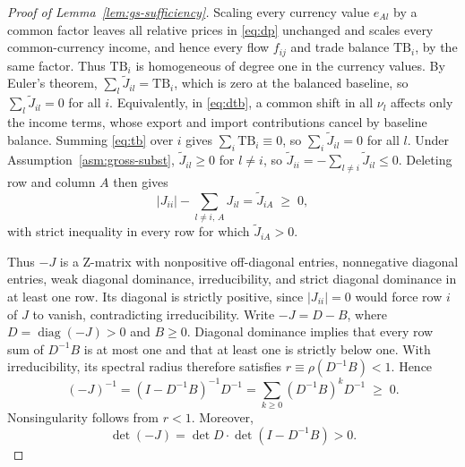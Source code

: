 \documentclass[11pt]{article}
\begin{document}
\begin{proof}[Proof of Lemma~\ref{lem:gs-sufficiency}]
Scaling every currency value $e_{Al}$ by a common factor leaves all relative prices in \eqref{eq:dp} unchanged and scales every common-currency income, and hence every flow $f_{ij}$ and trade balance $\mathrm{TB}_i$, by the same factor. Thus $\mathrm{TB}_i$ is homogeneous of degree one in the currency values. By Euler's theorem, $\sum_l\widetilde J_{il}=\mathrm{TB}_i$, which is zero at the balanced baseline, so $\sum_l\widetilde J_{il}=0$ for all $i$. Equivalently, in \eqref{eq:dtb}, a common shift in all $\nu_l$ affects only the income terms, whose export and import contributions cancel by baseline balance. Summing \eqref{eq:tb} over $i$ gives $\sum_i\mathrm{TB}_i\equiv0$, so $\sum_i\widetilde J_{il}=0$ for all $l$. Under Assumption~\ref{asm:gross-subst}, $\widetilde J_{il}\geq0$ for $l\neq i$, so $\widetilde J_{ii}=-\sum_{l\neq i}\widetilde J_{il}\leq0$. Deleting row and column $A$ then gives
\begin{equation}
|J_{ii}| - \sum_{l \neq i,\,A} J_{il} = \widetilde J_{iA} \;\geq\; 0 ,
\end{equation}
with strict inequality in every row for which $\widetilde J_{iA}>0$.

Thus $-J$ is a Z-matrix with nonpositive off-diagonal entries, nonnegative diagonal entries, weak diagonal dominance, irreducibility, and strict diagonal dominance in at least one row. Its diagonal is strictly positive, since $|J_{ii}|=0$ would force row $i$ of $J$ to vanish, contradicting irreducibility. Write $-J=D-B$, where $D=\operatorname{diag}(-J)>0$ and $B\geq0$. Diagonal dominance implies that every row sum of $D^{-1}B$ is at most one and that at least one is strictly below one. With irreducibility, its spectral radius therefore satisfies $r\equiv\rho(D^{-1}B)<1$. Hence
\[
(-J)^{-1} = (I-D^{-1}B)^{-1}D^{-1} = \sum_{k\geq0}(D^{-1}B)^kD^{-1} \;\geq\;0.
\]
Nonsingularity follows from $r<1$. Moreover,
\[
\det(-J) = \det D\cdot\det(I-D^{-1}B) > 0.
\]
\end{proof}
\end{document}
